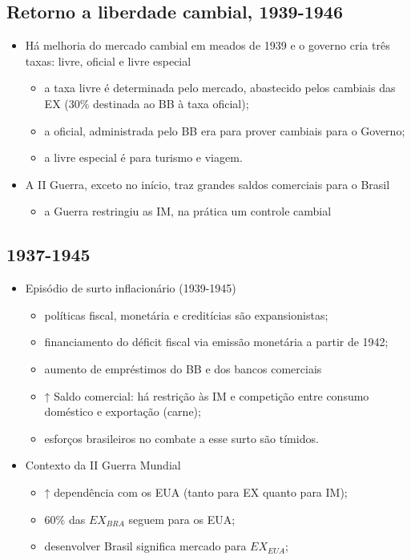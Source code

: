 \documentclass[a4paper,12pt]{article}[abntex2]
\begin{document}
\subsection{Retorno a liberdade cambial, 1939-1946}
\begin{itemize}
    \item Há melhoria do mercado cambial em meados de 1939 e o governo cria três taxas: livre, oficial e livre especial
    \begin{itemize}
        \item a taxa livre é determinada pelo mercado, abastecido pelos cambiais das EX (30\% destinada ao BB à taxa
oficial);
\item a oficial, administrada pelo BB era para prover cambiais para o Governo;
\item a livre especial é para turismo e viagem.
    \end{itemize}
    \item A II Guerra, exceto no início, traz grandes saldos comerciais para o Brasil
    \begin{itemize}
        \item a Guerra restringiu as IM, na prática um controle cambial
    \end{itemize}
\end{itemize}

\subsection{1937-1945}
\begin{itemize}
    \item Episódio de surto inflacionário (1939-1945)
    \begin{itemize}
        \item políticas fiscal, monetária e creditícias são expansionistas;
        \item financiamento do déficit fiscal via emissão monetária a partir de 1942;
        \item aumento de empréstimos do BB e dos bancos comerciais
        \item  ↑ Saldo comercial: há restrição às IM e competição entre consumo doméstico e exportação (carne);
        \item  esforços brasileiros no combate a esse surto são tímidos.
    \end{itemize}
    \item Contexto da II Guerra Mundial
    \begin{itemize}
        \item ↑ dependência com os EUA (tanto para EX quanto para IM);
        \item 60\% das $EX_{BRA}$ seguem para os EUA;
        \item desenvolver Brasil significa mercado para $EX_{EUA}$;
    \end{itemize}
\end{itemize}
\end{document}
